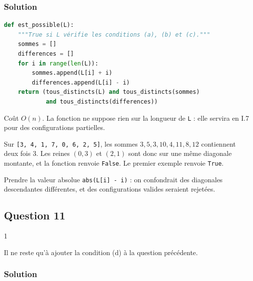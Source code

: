 \documentclass[11pt,a4paper]{article}
\begin{document}
\hypertarget{solution-9}{%
\subsubsection{Solution}\label{solution-9}}

\begin{lstlisting}[language=Python]
def est_possible(L):
    """True si L vérifie les conditions (a), (b) et (c)."""
    sommes = []
    differences = []
    for i in range(len(L)):
        sommes.append(L[i] + i)
        differences.append(L[i] - i)
    return (tous_distincts(L) and tous_distincts(sommes)
            and tous_distincts(differences))
\end{lstlisting}

Coût \(O(n)\). La fonction ne suppose rien sur la longueur de \texttt{L} : elle servira en I.7 pour des configurations partielles.

Sur \texttt{{[}3,\allowbreak{}\ 4,\allowbreak{}\ 1,\allowbreak{}\ 7,\allowbreak{}\ 0,\allowbreak{}\ 6,\allowbreak{}\ 2,\allowbreak{}\ 5{]}\allowbreak{}}, les sommes \(3, 5, 3, 10, 4, 11, 8, 12\) contiennent deux fois \(3\). Les reines \((0,3)\) et \((2,1)\) sont donc sur une même diagonale montante, et la fonction renvoie \texttt{False}. Le premier exemple renvoie \texttt{True}.

\begin{piege}

Prendre la valeur absolue \texttt{abs(L{[}i{]}\ -\ i)} : on confondrait des diagonales descendantes différentes, et des configurations valides seraient rejetées.

\end{piege}

\hypertarget{question-11}{%
\subsection{Question 11}\label{question-11}}

\begin{indication}{1}

Il ne reste qu'à ajouter la condition (d) à la question précédente.

\end{indication}

\hypertarget{solution-10}{%
\subsubsection{Solution}\label{solution-10}}
\end{document}
